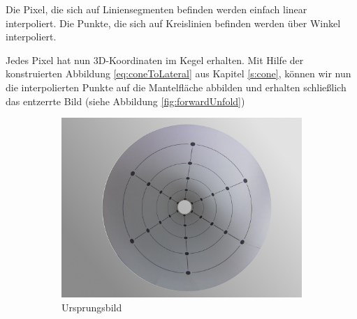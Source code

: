 Die Pixel, die sich auf Liniensegmenten befinden werden einfach linear interpoliert. Die Punkte, die sich auf Kreislinien befinden werden über Winkel interpoliert.

Jedes Pixel hat nun 3D-Koordinaten im Kegel erhalten. Mit Hilfe der konstruierten Abbildung \ref{eq:coneToLateral} aus Kapitel \ref{s:cone}, können wir nun die interpolierten Punkte auf die Mantelfläche abbilden und erhalten schließlich das entzerrte Bild (siehe Abbildung \ref{fig:forwardUnfold})



\begin{figure}[!htb]
	\centering
	\begin{subfigure}{.5\textwidth}
		\centering
		\includegraphics[width=.9\textwidth]{images/coneRasp.jpg}
		\caption{Ursprungsbild}
	\end{subfigure}%
	\begin{subfigure}{.5\textwidth}
		\centering

\end{subfigure}
\end{figure}
